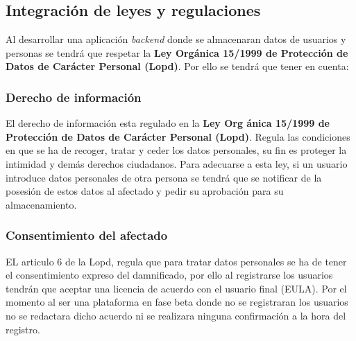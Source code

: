 \subsection{Integración de leyes y regulaciones}
Al desarrollar una aplicación \textit{backend} donde se almacenaran datos de usuarios y personas se tendrá que respetar la \textbf{Ley Orgánica 15/1999 de Protección de Datos de Carácter Personal (Lopd)}. Por ello se tendrá que tener en cuenta:

\subsubsection{Derecho de información}
El derecho de información esta regulado en la \textbf{Ley Org
ánica 15/1999 de Protección de Datos de Carácter Personal (Lopd)}. Regula las condiciones en que se ha  de recoger, tratar y ceder los datos personales, su fin es proteger la intimidad y demás derechos ciudadanos. Para adecuarse a esta ley, si un usuario introduce datos personales de otra persona se tendrá que se notificar de la posesión de estos datos al afectado y pedir su aprobación para su almacenamiento.

\subsubsection{Consentimiento del afectado}
EL articulo 6 de la Lopd, regula que para tratar datos personales se ha de tener el consentimiento expreso del damnificado, por ello al registrarse los usuarios tendrán que aceptar una licencia de acuerdo con el usuario final (EULA). Por el momento al ser una plataforma en fase beta donde no se registraran los usuarios no se redactara dicho acuerdo ni se realizara ninguna confirmación a la hora del registro.